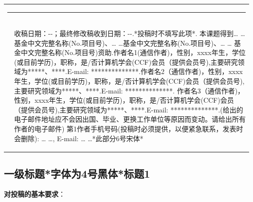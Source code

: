 \documentclass[10.5pt,compsoc]{CjC}
\theoremstyle{mystyle}
\begin{document}
\begin{table}[!t]
\setlength{\tabcolsep}{2pt}
\begin{tabular}{p{0.05cm}p{16.15cm}}
\multicolumn{2}{l}{\rule[4mm]{40mm}{0.1mm}}\\[-3mm]
&\begin{CJK*}{UTF8}{song}
收稿日期：\quad \quad -\quad -\quad ；最终修改稿收到日期：\quad \quad -\quad -\quad .*投稿时不填写此项*. 本课题得到… …基金中文完整名称(No.项目号)、… …基金中文完整名称(No.项目号)、… … 基金中文完整名称(No.项目号)资助.作者名1(通信作者)，性别，xxxx年生，学位(或目前学历)，职称，是/否计算机学会(CCF)会员（提供会员号),主要研究领域为*****、****.E-mail: **************.作者名2（通信作者)，性别，xxxx年生，学位(或目前学历)，职称，是/否计算机学会(CCF)会员（提供会员号),主要研究领域为*****、****.E-mail: **************. 作者名3（通信作者)，性别，xxxx年生，学位(或目前学历)，职称，是/否计算机学会(CCF)会员（提供会员号),主要研究领域为*****、****.E-mail: **************.(给出的电子邮件地址应不会因出国、毕业、更换工作单位等原因而变动。请给出所有作者的电子邮件)
第1作者手机号码(投稿时必须提供，以便紧急联系，发表时会删除): … …, E-mail: … …*此部分6号宋体*
\end{CJK*}
\end{tabular}\end{table}
\clearpage\clearpage
\begin{strip}
\vspace {-13mm}
\end{strip}
    \linespread{1.15}
    \begin{CJK*}{UTF8}{zhhei}
\vskip 1mm
\section{一级标题*字体为4号黑体*标题1}
\textbf{对投稿的基本要求}：
\end{CJK*}
\end{document}
